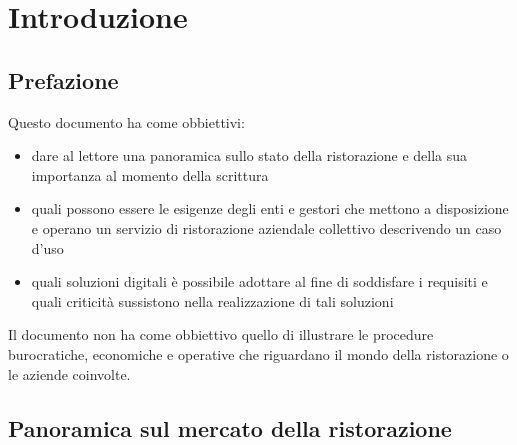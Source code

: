 \documentclass[a4paper, titlepage, 12pt, openright, twoside]{book}
\begin{document}
\begin{frontespizio}
\end{frontespizio}

\tableofcontents

\chapter{Introduzione}\label{chap:introduzione}

\section{Prefazione}

Questo documento ha come obbiettivi:
\begin{itemize}
	\item dare al lettore una panoramica sullo stato della ristorazione e della sua importanza al momento della scrittura
	\item quali possono essere le esigenze degli enti e gestori che mettono a disposizione e operano un servizio di ristorazione aziendale collettivo descrivendo un caso d'uso
	\item quali soluzioni digitali è possibile adottare al fine di soddisfare i requisiti e quali criticità sussistono nella realizzazione di tali soluzioni
\end{itemize}

Il documento non ha come obbiettivo quello di illustrare le procedure burocratiche, economiche e operative che riguardano il mondo della ristorazione o le aziende coinvolte.

\section{Panoramica sul mercato della ristorazione}
\end{document}

